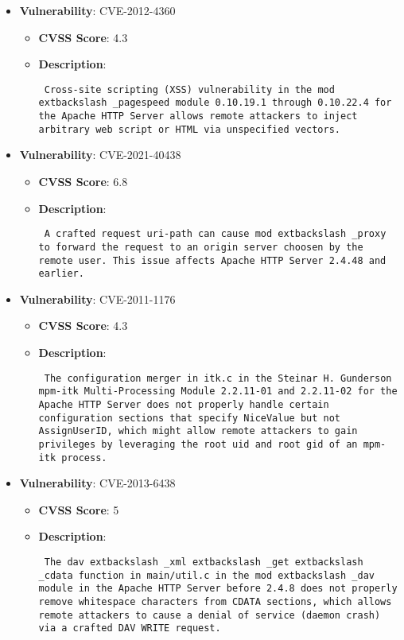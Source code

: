 \documentclass{article}
\begin{document}
\begin{itemize}
        \item \textbf{Vulnerability}: CVE-2012-4360
        \begin{itemize}
            \item \textbf{CVSS Score}:  4.3 
            \item \textbf{Description}: \parbox{\linewidth}{\texttt{ Cross-site scripting (XSS) vulnerability in the mod	extbackslash _pagespeed module 0.10.19.1 through 0.10.22.4 for the Apache HTTP Server allows remote attackers to inject arbitrary web script or HTML via unspecified vectors. }}
        \end{itemize}
    
        \item \textbf{Vulnerability}: CVE-2021-40438
        \begin{itemize}
            \item \textbf{CVSS Score}:  6.8 
            \item \textbf{Description}: \parbox{\linewidth}{\texttt{ A crafted request uri-path can cause mod	extbackslash _proxy to forward the request to an origin server choosen by the remote user. This issue affects Apache HTTP Server 2.4.48 and earlier. }}
        \end{itemize}
    
        \item \textbf{Vulnerability}: CVE-2011-1176
        \begin{itemize}
            \item \textbf{CVSS Score}:  4.3 
            \item \textbf{Description}: \parbox{\linewidth}{\texttt{ The configuration merger in itk.c in the Steinar H. Gunderson mpm-itk Multi-Processing Module 2.2.11-01 and 2.2.11-02 for the Apache HTTP Server does not properly handle certain configuration sections that specify NiceValue but not AssignUserID, which might allow remote attackers to gain privileges by leveraging the root uid and root gid of an mpm-itk process. }}
        \end{itemize}
    
        \item \textbf{Vulnerability}: CVE-2013-6438
        \begin{itemize}
            \item \textbf{CVSS Score}:  5 
            \item \textbf{Description}: \parbox{\linewidth}{\texttt{ The dav	extbackslash _xml	extbackslash _get	extbackslash _cdata function in main/util.c in the mod	extbackslash _dav module in the Apache HTTP Server before 2.4.8 does not properly remove whitespace characters from CDATA sections, which allows remote attackers to cause a denial of service (daemon crash) via a crafted DAV WRITE request. }}
        \end{itemize}
    

\end{itemize}
\end{document}
